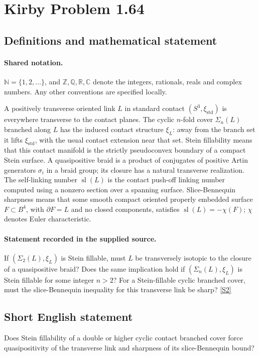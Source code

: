 \documentclass[11pt]{article}
\newcommand{\sref}[2]{\hyperlink{source:#1:#2}{[S#2]}}
\begin{document}
\section{Kirby Problem 1.64}\label{statement}

\subsection{Definitions and mathematical statement}

\paragraph{Shared notation.}$\mathbb N=\{1,2,\ldots\}$, and $\mathbb Z,\mathbb Q,\mathbb R,\mathbb C$ denote the integers, rationals, reals and complex numbers. Any other conventions are specified locally.


A positively transverse oriented link $L$ in standard contact $(S^3,\xi_{\mathrm{std}})$ is everywhere transverse to the contact planes. The cyclic $n$-fold cover $\Sigma_n(L)$ branched along $L$ has the induced contact structure $\xi_L$: away from the branch set it lifts $\xi_{\mathrm{std}}$, with the usual contact extension near that set. Stein fillability means that this contact manifold is the strictly pseudoconvex boundary of a compact Stein surface. A quasipositive braid is a product of conjugates of positive Artin generators $\sigma_i$ in a braid group; its closure has a natural transverse realization. The self-linking number $\operatorname{sl}(L)$ is the contact push-off linking number computed using a nonzero section over a spanning surface. Slice-Bennequin sharpness means that some smooth compact oriented properly embedded surface $F\subset B^4$, with $\partial F=L$ and no closed components, satisfies $\operatorname{sl}(L)=-\chi(F)$; $\chi$ denotes Euler characteristic.
\paragraph{Statement recorded in the supplied source.}
If $(\Sigma_2(L),\xi_L)$ is Stein fillable, must $L$ be transversely isotopic to the closure of a quasipositive braid? Does the same implication hold if $(\Sigma_n(L),\xi_L)$ is Stein fillable for some integer $n>2$? For a Stein-fillable cyclic branched cover, must the slice-Bennequin inequality for this transverse link be sharp? \sref{statement}{2}

\subsection{Short English statement}
Does Stein fillability of a double or higher cyclic contact branched cover force quasipositivity of the transverse link and sharpness of its slice-Bennequin bound?
\end{document}
